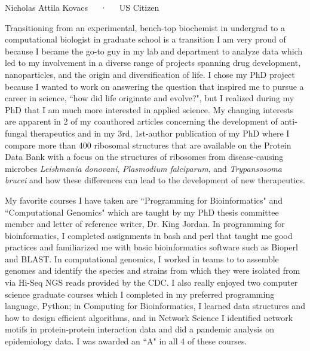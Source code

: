 \documentclass[11pt, letterpaper]{CV_latex_class}
\begin{document}
\makecvheader

\makecvfooter
  {Nicholas Attila Kovacs~~~·~~~US Citizen}

\makelettertitle

\begin{cvletter}


\hspace{1em} Transitioning from an experimental, bench-top biochemist in undergrad to a computational biologist in graduate school is a transition I am very proud of because I became the go-to guy in my lab and department to analyze data which led to my involvement in a diverse range of projects spanning drug development, nanoparticles, and the origin and diversification of life. I chose my PhD project because I wanted to work on answering the question that inspired me to pursue a career in science, ``how did life originate and evolve?", but I realized during my PhD that I am much more interested in applied science. My changing interests are apparent in 2 of my coauthored articles concerning the development of anti-fungal therapeutics and in my 3rd, 1st-author publication of my PhD where I compare more than 400 ribosomal structures that are available on the Protein Data Bank with a focus on the structures of ribosomes from disease-causing microbes \textit{Leishmania donovani}, \textit{Plasmodium falciparum}, and \textit{Trypansosoma brucei} and how these differences can lead to the development of new therapeutics.

\hspace{1em}My favorite courses I have taken are ``Programming for Bioinformatics" and ``Computational Genomics" which are taught by my PhD thesis committee member and letter of reference writer, Dr. King Jordan. In programming for bioinformatics, I completed assignments in bash and perl that taught me good practices and familiarized me with basic bioinformatics software such as Bioperl and BLAST. In computational genomics, I worked in teams to to assemble genomes and identify the species and strains from which they were isolated from via Hi-Seq NGS reads provided by the CDC. I also really enjoyed two computer science graduate courses which I completed in my preferred programming language, Python; in Computing for Bioinformatics, I learned data structures and how to design efficient algorithms, and in Network Science I identified network motifs in protein-protein interaction data and did a pandemic analysis on epidemiology data. I was awarded an ``A" in all 4 of these courses.  


\end{cvletter}
\end{document}
